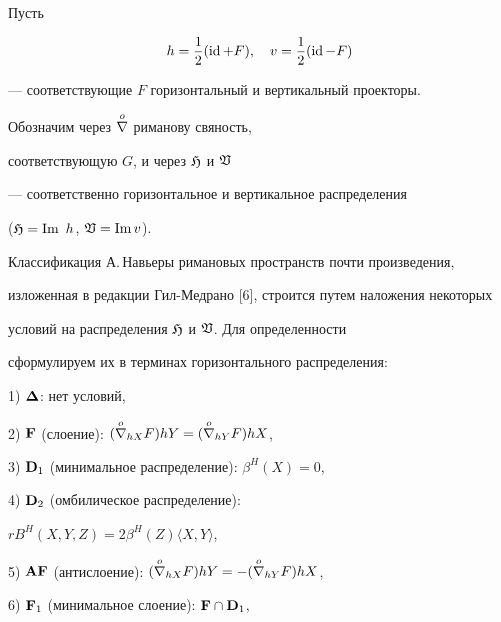 Пусть


\begin{equation}


h={\frac 12} ( \id + F),\quad v={\frac 12} ( \id - F)


\end{equation}


--- соответствующие $F$ горизонтальный и вертикальный проекторы.


Обозначим через $\overset{o}{\nabla}{}$ риманову свяность,


соответствующую $G$, и через $\frak H$ и $\frak V$


--- соответственно горизонтальное и вертикальное распределения


($\frak H=\text {Im } \,h $, $ \frak V=\text {Im} \,v $).





Классификация А.\,Навьеры римановых пространств почти произведения,


изложенная в редакции Гил-Медрано [6], строится путем наложения некоторых


условий на распределения $\frak H$ и $\frak V$. Для определенности


сформулируем их в терминах горизонтального распределения:





1) $\boldsymbol {\Delta}$: нет условий,





2) $\bold F$ (слоение): $(\overset{o}{\nabla}{}_{hX}F)hY=(\overset{o}{\nabla}{}_{hY}F)hX$,





3) $\bold D_1$ (минимальное распределение): $ \beta^H(X)=0$,





4) $\bold D_2$ (омбилическое распределение):


$r B^H(X,Y,Z)=2\beta^H(Z)\langle X,Y\rangle$,





5) $\bold {AF}$ (антислоение): $(\os{\nb}{o}_{hX}F)hY=


-(\os{\nb}o_{hY}F)hX$,





6) $\bold F_1$ (минимальное слоение): $\bold F \cap \bold D_1$,





